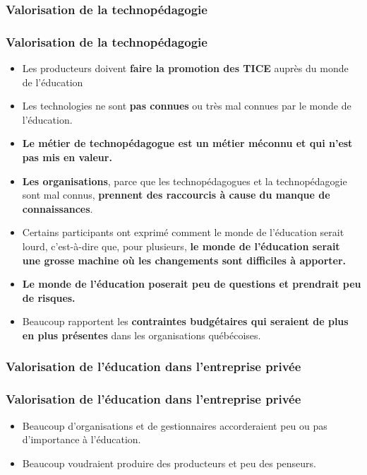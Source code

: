 				\subsubsection{Valorisation de la technopédagogie} 
						\begin{frame}[allowframebreaks]
						\frametitle{Valorisation de la technopédagogie}
                        			
                        			\begin{itemize}
                        			\item Les producteurs doivent \textbf{faire la promotion des TICE} auprès du monde de l’éducation
                        			\item Les technologies ne sont \textbf{pas connues} ou très mal connues par le monde de l’éducation. 
                        			\item \textbf{Le métier de technopédagogue est un métier méconnu et qui n’est pas mis en valeur. }
                        			\item \textbf{Les organisations}, parce que les technopédagogues et la technopédagogie sont mal connus, \textbf{prennent des raccourcis à cause du manque de connaissances}. 
                        			\item Certains participants ont exprimé comment le monde de l’éducation serait lourd, c’est-à-dire que, pour plusieurs, \textbf{le monde de l’éducation serait une grosse machine où les changements sont difficiles à apporter. }
                        			\item \textbf{Le monde de l’éducation poserait peu de questions et prendrait peu de risques.} 
                        			\item Beaucoup rapportent les \textbf{contraintes budgétaires qui seraient de plus en plus présentes} dans les organisations québécoises. 
						\end{itemize}
						
						\end{frame}	
						
					\subsubsection{Valorisation de l'éducation dans l'entreprise privée} 
						\begin{frame}[allowframebreaks]
						\frametitle{Valorisation de l'éducation dans l'entreprise privée}
                        			
                        			\begin{itemize}
                        			\item Beaucoup d’organisations et de gestionnaires accorderaient peu ou pas d’importance à l’éducation. 
                        			\item Beaucoup voudraient produire des producteurs et peu des penseurs. 
                        			
						\end{itemize}
						\end{frame}	
						
